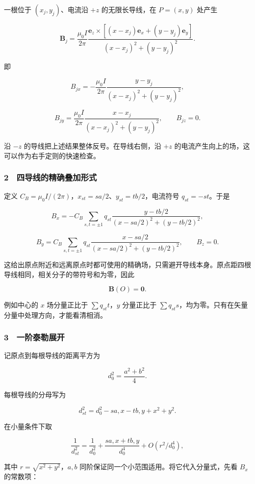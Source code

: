 \documentclass[12pt,a4paper,fontset=fandol]{ctexart}
\begin{document}
一根位于 \((x_j,y_j)\)、电流沿 \(+z\) 的无限长导线，在 \(P=(x,y)\)
处产生

\[\boldsymbol B_j
=\frac{\mu_0I}{2\pi}
\frac{\boldsymbol e_z\times[(x-x_j)\boldsymbol e_x+(y-y_j)\boldsymbol e_y]}
{(x-x_j)^2+(y-y_j)^2}.\]

即

\[B_{jx}=-\frac{\mu_0I}{2\pi}
\frac{y-y_j}{(x-x_j)^2+(y-y_j)^2},\]

\[B_{jy}=\frac{\mu_0I}{2\pi}
\frac{x-x_j}{(x-x_j)^2+(y-y_j)^2},
\qquad B_{jz}=0.\]

沿 \(-z\) 的导线把上述结果整体反号。在导线右侧，沿 \(+z\)
的电流产生向上的场，这可以作为右手定则的快速检查。

\subsubsection{2　四导线的精确叠加形式}\label{ux56dbux5bfcux7ebfux7684ux7cbeux786eux53e0ux52a0ux5f62ux5f0f}

定义 \(C_B=\mu_0I/(2\pi)\)，\(x_{st}=sa/2\)、\(y_{st}=tb/2\)，电流符号
\(q_{st}=-st\)。于是

\[\boxed{B_x=-C_B\sum_{s,t=\pm1}
q_{st}\frac{y-tb/2}{(x-sa/2)^2+(y-tb/2)^2},}\]

\[\boxed{B_y=C_B\sum_{s,t=\pm1}
q_{st}\frac{x-sa/2}{(x-sa/2)^2+(y-tb/2)^2},
\qquad B_z=0.}\]

这给出原点附近和远离原点时都可使用的精确场，只需避开导线本身。原点距四根导线相同，相关分子的带符号和为零，因此

\[\boxed{\boldsymbol B(O)=\boldsymbol0.}\]

例如中心的 \(x\) 场分量正比于 \(\sum q_{st}t\)，\(y\) 分量正比于
\(\sum q_{st}s\)，均为零。只有在矢量分量中处理方向，才能看清相消。

\subsubsection{3　一阶泰勒展开}\label{ux4e00ux9636ux6cf0ux52d2ux5c55ux5f00}

记原点到每根导线的距离平方为

\[d_0^2=\frac{a^2+b^2}{4}.\]

每根导线的分母写为

\[d_{st}^2=d_0^2-sa,x-tb,y+x^2+y^2.\]

在小量条件下取

\[\frac1{d_{st}^2}
=\frac1{d_0^2}+
\frac{sa,x+tb,y}{d_0^4}+O(r^2/d_0^4),\]

其中 \(r=\sqrt{x^2+y^2}\)，\(a,b\)
同阶保证同一个小范围适用。将它代入分量式，先看 \(B_x\) 的常数项：
\end{document}
